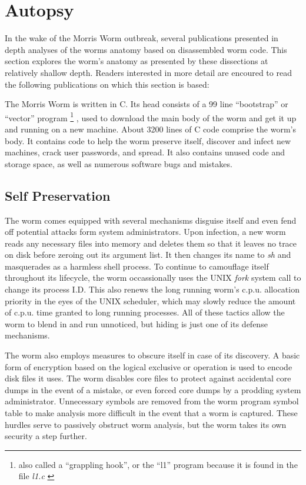 \section*{Autopsy}
In the wake of the Morris Worm outbreak, several
publications presented in depth analyses of the worms
anatomy based on disassembled worm code. This section explores the worm's
anatomy as presented by these dissections at relatively shallow depth. Readers interested
in more detail are encoured to read the following publications on which this
section is based: 
\cite{seeley_tour_1989}
\cite{spafford_crisis_1989}
\cite{spafford_internet_1989}
\cite{eichin_microscope_1989}

The Morris Worm is written in C. Its head consists of a 99 line ``bootstrap''
or ``vector'' program
\footnote{
also called a ``grappling hook'', or the ``l1'' program because it is found in 
the file \textit{l1.c} \cite{spafford_crisis_1989}
}
, used to download the main body of the worm and get it up
and running on a new machine. About 3200 lines of C code comprise the worm's
body. It contains code to help the worm preserve itself, discover and infect
new machines, crack user passwords, and spread. It also contains unused code
and storage space, as well as
numerous software bugs and mistakes.


\subsection*{Self Preservation}
The worm comes equipped with several mechanisms disguise itself and even fend off potential attacks form system administrators. Upon infection, a
new worm reads any necessary files into memory and deletes them so that it
leaves no trace on disk before zeroing out its argument list. It then changes
its name to \textit{sh} and masquerades as a harmless shell process. To
continue to camouflage itself throughout its lifecycle, the worm occassionally uses the
UNIX \textit{fork} system call to change its process I.D. This also renews the
long running worm's c.p.u. allocation priority in the eyes of the UNIX
scheduler, which may slowly reduce the amount of c.p.u. time granted to long
running processes. All of these tactics allow the worm to blend in and run
unnoticed, but hiding is just one of its defense mechanisms.

The worm also employs measures to obscure itself in case of its discovery. A
basic form of encryption based on the logical exclusive or operation is used to
encode disk files it uses. The worm disables core files to protect against
accidental core dumps in the event of a mistake, or even forced core dumps by a
prodding system administrator. Unnecessary symbols are removed from the worm
program symbol table to make analysis more difficult in the event that a worm is
captured. These hurdles serve to passively obstruct worm analysis, but the worm
takes its own security a step further.


